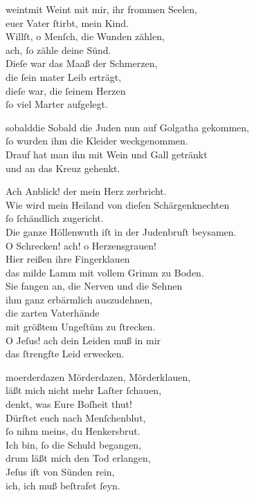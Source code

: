 \documentclass[shorttitlesize=55,tocstyle=ref-genre]{ees}
\begin{document}
{\begin{movement}{weintmit}
  Weint mit mir, ihr frommen Seelen,\\
  euer Vater ſtirbt, mein Kind.\\
  Willſt, o Menſch, die Wunden zählen,\\
  ach, ſo zähle deine Sünd.\\
  Dieſe war das Maaß der Schmerzen,\\
  die ſein mater Leib erträgt,\\
  dieſe war, die ſeinem Herzen\\
  ſo viel Marter aufgelegt.
\end{movement}

\begin{movement}{sobalddie}
  \voice[Evangelium]
  Sobald die Juden nun auf Golgatha gekommen,\\
  ſo wurden ihm die Kleider weckgenommen.\\
  Drauf hat man ihn mit Wein und Gall getränkt\\
  und an das Kreuz gehenkt.

  Ach Anblick! der mein Herz zerbricht.\\
  Wie wird mein Heiland von dieſen Schärgenknechten\\
  ſo ſchändlich zugericht.\\
  Die ganze Höllenwuth iſt in der Judenbruſt beysamen.\\
  O Schrecken! ach! o Herzensgrauen!\\
  Hier reißen ihre Fingerklauen\\
  das milde Lamm mit vollem Grimm zu Boden.\\
  Sie fangen an, die Nerven und die Sehnen\\
  ihm ganz erbärmlich auszudehnen,\\
  die zarten Vaterhände\\
  mit größtem Ungeſtüm zu ſtrecken.\\
  O Jeſus! ach dein Leiden muß in mir\\
  das ſtrengſte Leid erwecken.
\end{movement}

\begin{movement}{moerderdazen}
  Mörderdazen, Mörderklauen,\\
  läßt mich nicht mehr Laſter ſchauen,\\
  denkt, was Eure Boſheit thut!\\
  Dürſtet euch nach Menſchenblut,\\
  ſo nihm meins, du Henkersbrut.\\
  Ich bin, ſo die Schuld begangen,\\
  drum läßt mich den Tod erlangen,\\
  Jeſus iſt von Sünden rein,\\
  ich, ich muß beſtrafet ſeyn.
\end{movement}

}
\end{document}
